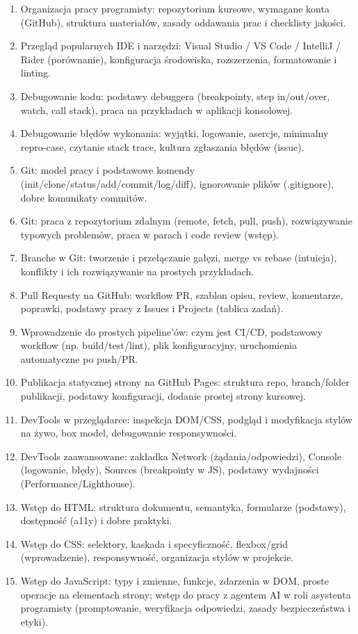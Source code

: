 \documentclass[12pt, a4paper]{article}
\begin{document}
\begin{enumerate}
  \item Organizacja pracy programisty: repozytorium kursowe, wymagane konta (GitHub), struktura materiałów, zasady oddawania prac i checklisty jakości.
  \item Przegląd popularnych IDE i narzędzi: Visual Studio / VS Code / IntelliJ / Rider (porównanie), konfiguracja środowiska, rozszerzenia, formatowanie i linting.
  \item Debugowanie kodu: podstawy debuggera (breakpointy, step in/out/over, watch, call stack), praca na przykładach w aplikacji konsolowej.
  \item Debugowanie błędów wykonania: wyjątki, logowanie, asercje, minimalny repro-case, czytanie stack trace, kultura zgłaszania błędów (issue).
  \item Git: model pracy i podstawowe komendy (init/clone/status/add/commit/log/diff), ignorowanie plików (.gitignore), dobre komunikaty commitów.
  \item Git: praca z repozytorium zdalnym (remote, fetch, pull, push), rozwiązywanie typowych problemów, praca w parach i code review (wstęp).
  \item Branche w Git: tworzenie i przełączanie gałęzi, merge vs rebase (intuicja), konflikty i ich rozwiązywanie na prostych przykładach.
  \item Pull Requesty na GitHub: workflow PR, szablon opisu, review, komentarze, poprawki, podstawy pracy z Issues i Projects (tablica zadań).
  \item Wprowadzenie do prostych pipeline’ów: czym jest CI/CD, podstawowy workflow (np. build/test/lint), plik konfiguracyjny, uruchomienia automatyczne po push/PR.
  \item  Publikacja statycznej strony na GitHub Pages: struktura repo, branch/folder publikacji, podstawy konfiguracji, dodanie prostej strony kursowej.
  \item  DevTools w przeglądarce: inspekcja DOM/CSS, podgląd i modyfikacja stylów na żywo, box model, debugowanie responsywności.
  \item  DevTools zaawansowane: zakładka Network (żądania/odpowiedzi), Console (logowanie, błędy), Sources (breakpointy w JS), podstawy wydajności (Performance/Lighthouse).
  \item  Wstęp do HTML: struktura dokumentu, semantyka, formularze (podstawy), dostępność (a11y) i dobre praktyki.
  \item  Wstęp do CSS: selektory, kaskada i specyficzność, flexbox/grid (wprowadzenie), responsywność, organizacja stylów w projekcie.
  \item  Wstęp do JavaScript: typy i zmienne, funkcje, zdarzenia w DOM, proste operacje na elementach strony; wstęp do pracy z agentem AI w roli asystenta programisty (promptowanie, weryfikacja odpowiedzi, zasady bezpieczeństwa i etyki).
\end{enumerate}
\end{document}
